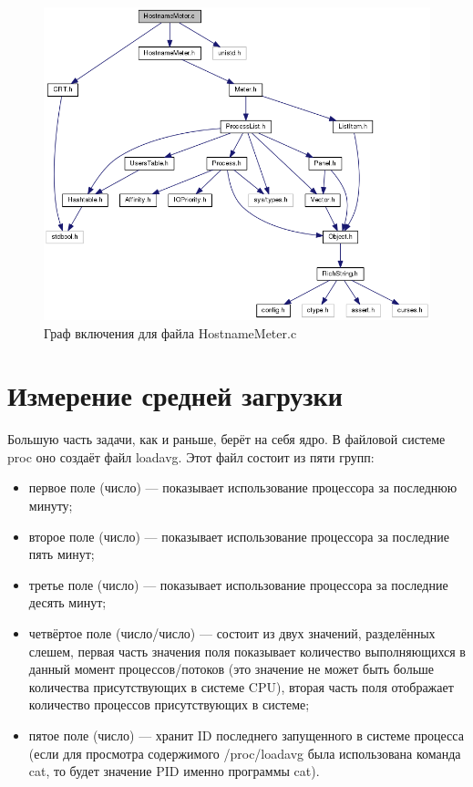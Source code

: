 \documentclass[a4paper, 12pt]{article}		%
\begin{document}
\begin{figure}[h!]
\centering
\includegraphics[scale=0.6]{res/hostname_meter.png}
\caption{Граф включения для файла HostnameMeter.c}
\end{figure}

\newpage
\section{Измерение средней загрузки}

Большую часть задачи, как и раньше, берёт на себя ядро. В файловой системе proc оно создаёт файл loadavg. Этот файл состоит из пяти групп:
\begin{itemize}
\item первое поле (число) — показывает использование процессора за последнюю минуту;
\item второе поле (число) — показывает использование процессора за последние пять минут;
\item третье поле (число) — показывает использование процессора за последние десять минут;
\item четвёртое поле (число/число) — состоит из двух значений, разделённых слешем, первая часть значения поля показывает количество выполняющихся в данный момент процессов/потоков (это значение не может быть больше количества присутствующих в системе CPU), вторая часть поля отображает количество процессов присутствующих в системе;
\item пятое поле (число) — хранит ID последнего запущенного в системе процесса (если для просмотра содержимого /proc/loadavg была использована команда cat, то будет значение PID именно программы cat).
\end{itemize}
\end{document}

